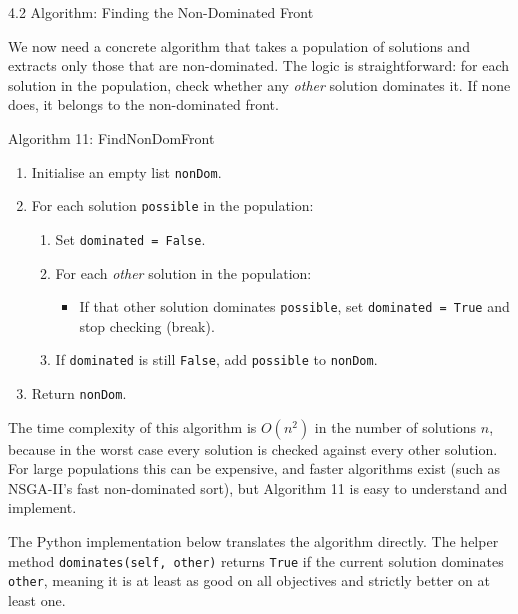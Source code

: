 \documentclass[aspectratio=169,10pt]{beamer}
\begin{document}
\begin{frame}[allowframebreaks]{4.2 Algorithm: Finding the Non-Dominated Front}

  We now need a concrete algorithm that takes a population of solutions and
  extracts only those that are non-dominated.  The logic is straightforward: for
  each solution in the population, check whether any \emph{other} solution
  dominates it.  If none does, it belongs to the non-dominated front.

  \begin{block}{Algorithm 11: FindNonDomFront}
    \begin{enumerate}
      \item Initialise an empty list \texttt{nonDom}.
      \item For each solution \texttt{possible} in the population:
        \begin{enumerate}
          \item Set \texttt{dominated = False}.
          \item For each \emph{other} solution in the population:
            \begin{itemize}
              \item If that other solution dominates \texttt{possible}, set
                \texttt{dominated = True} and stop checking (break).
            \end{itemize}
          \item If \texttt{dominated} is still \texttt{False}, add
            \texttt{possible} to \texttt{nonDom}.
        \end{enumerate}
      \item Return \texttt{nonDom}.
    \end{enumerate}
  \end{block}

  The time complexity of this algorithm is $O(n^2)$ in the number of solutions
  $n$, because in the worst case every solution is checked against every other
  solution.  For large populations this can be expensive, and faster algorithms
  exist (such as NSGA-II's fast non-dominated sort), but Algorithm 11 is easy to
  understand and implement.

  \framebreak

  The Python implementation below translates the algorithm directly.  The helper
  method \texttt{dominates(self, other)} returns \texttt{True} if the current
  solution dominates \texttt{other}, meaning it is at least as good on all
  objectives and strictly better on at least one.

\end{frame}
\end{document}
